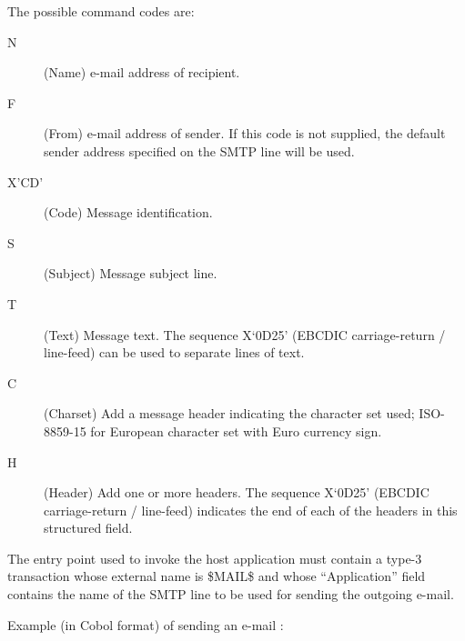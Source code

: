 \documentclass[letterpaper,10pt,english]{sphinxmanual}
\begin{document}

The possible command codes are:
\begin{description}
\item[{N}] \leavevmode
(Name) e-mail address of recipient.

\item[{F}] \leavevmode
(From) e-mail address of sender. If this code is not supplied, the default sender address specified on the SMTP line will be used.

\item[{X’CD’}] \leavevmode
(Code) Message identification.

\item[{S}] \leavevmode
(Subject) Message subject line.

\item[{T}] \leavevmode
(Text) Message text. The sequence X‘0D25’ (EBCDIC carriage-return / line-feed) can be used to separate lines of text.

\item[{C}] \leavevmode
(Charset) Add a message header indicating the character set used; ISO-8859-15 for European character set with Euro currency sign.

\item[{H}] \leavevmode
(Header) Add one or more headers. The sequence X‘0D25’ (EBCDIC carriage-return / line-feed) indicates the end of each of the headers in this structured field.

\end{description}

The entry point used to invoke the host application must contain a type-3 transaction whose external name is \$MAIL\$
and whose “Application” field contains the name of the SMTP line to be used for sending the outgoing e-mail.


Example (in Cobol format) of sending an e-mail :
\end{document}
